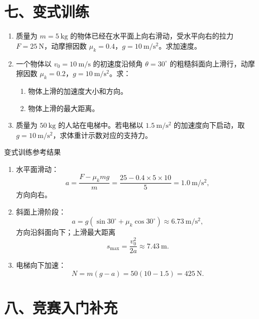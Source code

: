 \section*{七、变式训练}

\begin{enumerate}
  \item 质量为 $m = 5\ \mathrm{kg}$ 的物体已经在水平面上向右滑动，受水平向右的拉力 $F = 25\ \mathrm{N}$，动摩擦因数 $\mu_k = 0.4$，$g = 10\ \mathrm{m/s^2}$。求加速度。

  \item 一个物体以 $v_0 = 10\ \mathrm{m/s}$ 的初速度沿倾角 $\theta = 30^\circ$ 的粗糙斜面向上滑行，动摩擦因数 $\mu_k = 0.2$，$g = 10\ \mathrm{m/s^2}$。求：
  \begin{center}
  
  \end{center}
  \begin{enumerate}
    \item 物体上滑的加速度大小和方向。
    \item 物体上滑的最大距离。
  \end{enumerate}

  \item 质量为 $50\ \mathrm{kg}$ 的人站在电梯中。若电梯以 $1.5\ \mathrm{m/s^2}$ 的加速度向下启动，取 $g=10\ \mathrm{m/s^2}$，求体重计示数对应的支持力。
  \begin{center}
  
  \end{center}
\end{enumerate}

\begin{learningbox}{变式训练参考结果}
\begin{enumerate}[itemsep=0.45em,topsep=0.3em,parsep=0pt]
  \item 水平面滑动：
  \[
  a=\frac{F-\mu_kmg}{m}
   =\frac{25-0.4\times5\times10}{5}
   =1.0\ \mathrm{m/s^2},
  \]
  方向向右。

  \item 斜面上滑阶段：
  \[
  a=g(\sin30^\circ+\mu_k\cos30^\circ)
   \approx6.73\ \mathrm{m/s^2},
  \]
  方向沿斜面向下；上滑最大距离
  \[
  s_{\max}=\frac{v_0^2}{2a}\approx7.43\ \mathrm{m}.
  \]

  \item 电梯向下加速：
  \[
  N=m(g-a)=50(10-1.5)=425\ \mathrm{N}.
  \]
\end{enumerate}
\end{learningbox}

\section*{八、竞赛入门补充}

